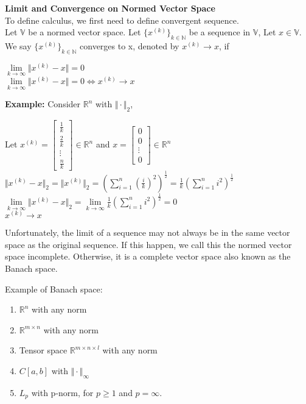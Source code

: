 \documentclass{article}
\begin{document}
\pagebreak
\textbf{Limit and Convergence on Normed Vector Space} \\ 
To define calculus, we first need to define convergent sequence. \\
Let $\mathbb{V}$ be a normed vector space. Let $\{x^{(k)}\}_{k \in \mathbb{N}}$ be a sequence in $\mathbb{V}$, Let $ x \in \mathbb{V}$. We say $\{x^{(k)}\}_{k \in \mathbb{N}}$ converges to x, denoted by $x^{(k)} \to x$, if 
    \begin{center}
        $\underset{k \to \infty}{\lim} \Vert x^{(k)}- x \Vert = 0$ \\
        $\underset{k \to \infty}{\lim} \Vert x^{(k)} - x \Vert = 0 \iff x^{(k)} \to x$ 
    \end{center}

\bigbreak

\textbf{Example: } Consider $\mathbb{R}^{n}$ with $\Vert \cdot \Vert_2$, 
    \begin{center}
        Let $x^{(k)} = \begin{bmatrix} \frac{1}{k} \\ \frac{2}{k} \\ \vdots \\ \frac{n}{k} \end{bmatrix} \in \mathbb{R}^{n}$ and $x = \begin{bmatrix} 0 \\ 0 \\ \vdots \\ 0 \end{bmatrix} \in \mathbb{R}^{n}$ \\
        \bigbreak
        $\Vert x^{(k)} - x \Vert_2 = \Vert x^{(k)} \Vert_2 = (\sum_{i=1}^{n} (\frac{i}{k})^2)^\frac{1}{2} = \frac{1}{k} (\sum_{i=1}^{n} i^2)^\frac{1}{2}$ \\
        $\underset{k \to \infty}{\lim} \Vert x^{(k)} - x \Vert_2 = \underset{k \to \infty}{\lim} \frac{1}{k} (\sum_{i=1}^{n} i^2)^\frac{1}{2} = 0 $ \\
        $x^{(k)} \to x$
    \end{center}
Unfortunately, the limit of a sequence may not always be in the same vector space as the original sequence. If this happen, we call this the normed vector space incomplete. Otherwise, it is a complete vector space also known as the Banach space.

\bigbreak

Example of Banach space:
\begin{enumerate}
    \item $\mathbb{R}^{n}$ with any norm
    \item  $\mathbb{R}^{m \times n}$ with any norm
    \item Tensor space $\mathbb{R} ^ {m \times n \times l}$ with any norm
    \item $C[a,b]$ with $\Vert \cdot \Vert_\infty$
    \item $L_p$ with p-norm, for $p \geq 1$ and $p = \infty$.
\end{enumerate}
\end{document}
